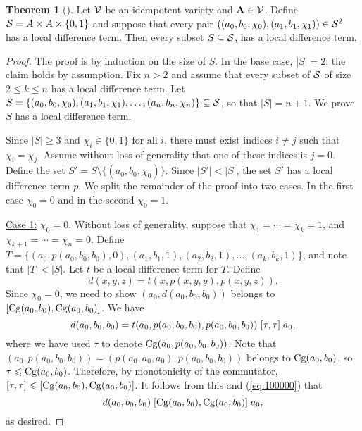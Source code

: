 \documentclass[12pt]{amsart}
\numberwithin{equation}{section}
\theoremstyle{plain}
\theoremstyle{definition}
\newtheorem*{thm}{Theorem}
\begin{document}
\begin{thm}[]
  \label{thm:local-diff-terms}
  Let $\mathcal{V}$ be an idempotent variety and
  $\mathbf{A} \in \mathcal{V}$. Define
  $\mathcal{S}= A \times A \times \{0,1\}$
  and suppose that every pair
  $((a_0, b_0, \chi_0), (a_1, b_1, \chi_1)) \in \mathcal{S}^2$
  has a local difference term.
  Then every subset $S \subseteq \mathcal{S}$,
  has a local difference term.
\end{thm}
\begin{proof}
The proof is by induction on the size of $S$.  In the base case, $|S| = 2$,
the claim holds by assumption.
Fix $n>2$ and assume that every subset of $\mathcal{S}$ of size $2\leq k \leq n$ has a local
difference term. Let
$S = \{(a_0, b_0, \chi_0), (a_1, b_1, \chi_1), \dots, (a_{n}, b_{n},\chi_{n})\} \subseteq \mathcal{S}$,
so that $|S| = n+1$.  We prove $S$ has a local difference term.

Since $|S| \geq 3$ and $\chi_i \in \{0,1\}$ for all $i$, there must exist
indices $i\neq j$ such that $\chi_i = \chi_j$. Assume without loss of generality
that one of these indices is $j=0$.  Define
the set
$S' = S \setminus \{(a_0, b_0, \chi_0)\}$.
Since $|S'| < |S|$, the set $S'$ has a local difference term $p$.
We split the remainder of the proof into two cases. In the first case
$\chi_0 = 0$ and in the second
$\chi_0 = 1$.

\vskip3mm

\noindent \underline{Case 1:} $\chi_0 = 0$.
Without loss of generality, suppose that $\chi_1 = %
\cdots =\chi_k = 1$,
and $\chi_{k+1} %
= \cdots = \chi_{n} = 0$. Define %
$T = \{(a_0, p(a_0, b_0, b_0), 0),
(a_1, b_1, 1), (a_2, b_2, 1), 
\dots, (a_k, b_k, 1)\}$, and 
note that $|T| < |S|$.
Let $t$ be a local difference term for $T$.
Define
\[
d(x,y,z) = t(x, p(x,y,y), p(x,y,z)).
\]
Since $\chi_0 =0$, we need to show
$(a_0, d(a_0,b_0,b_0))$ belongs to $\mathrel{[\operatorname{Cg}(a_0,b_0), \operatorname{Cg}(a_0,b_0)]}$.
We have
\begin{equation}
    \label{eq:100000}
  d(a_0,b_0,b_0) =
  t(a_0, p(a_0,b_0,b_0), p(a_0,b_0,b_0))\mathrel{[\tau, \tau]} a_0,
\end{equation}
where we have used $\tau$ to denote $\operatorname{Cg}(a_0, p(a_0,b_0,b_0))$.
Note that
$(a_0, p(a_0,b_0,b_0)) = (p(a_0,a_0,a_0), p(a_0,b_0,b_0))$
belongs to $\operatorname{Cg}(a_0, b_0)$,
so $\tau\leqslant \operatorname{Cg}(a_0,b_0)$. Therefore,
by monotonicity of the commutator,
$\mathrel{[\tau, \tau]} {\leqslant} \mathrel{[\operatorname{Cg}(a_0,b_0), \operatorname{Cg}(a_0,b_0)]}$.
It follows from this and (\ref{eq:100000}) that
\[d(a_0,b_0,b_0)\mathrel{[\operatorname{Cg}(a_0,b_0), \operatorname{Cg}(a_0,b_0)]} a_0,\]
as desired.


\end{proof}
\end{document}
